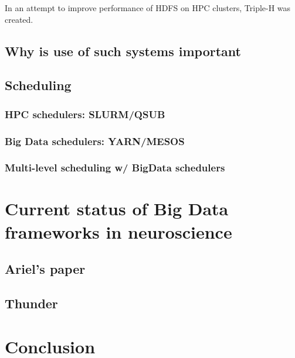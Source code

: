 \documentclass{report}
\begin{document}

	
	
	
	In an attempt to improve performance of HDFS on HPC clusters, Triple-H was created.
	\section{Why is use of such systems important}
	\section{Scheduling}
		\subsection{HPC schedulers: SLURM/QSUB}
		\subsection{Big Data schedulers: YARN/MESOS}
		\subsection{Multi-level scheduling w/ BigData schedulers}
\chapter{Current status of Big Data frameworks in neuroscience}
	\section{Ariel's paper}
	\section{Thunder}
\chapter{Conclusion}





\end{document}
